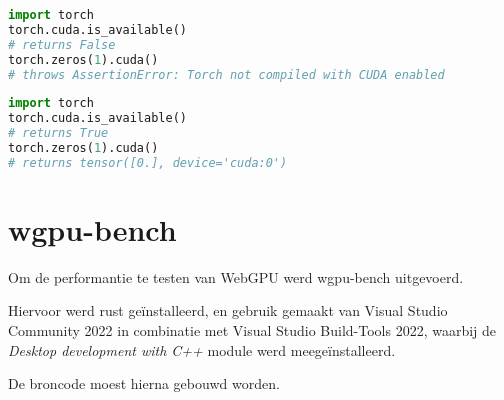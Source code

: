 \begin{lstlisting}[language=python]
import torch
torch.cuda.is_available()
# returns False
torch.zeros(1).cuda()
# throws AssertionError: Torch not compiled with CUDA enabled
\end{lstlisting}


\begin{lstlisting}[language=python]
import torch
torch.cuda.is_available()
# returns True
torch.zeros(1).cuda()
# returns tensor([0.], device='cuda:0')
\end{lstlisting}







\break{}

\section{wgpu-bench}

Om de performantie te testen van WebGPU werd wgpu-bench uitgevoerd.

Hiervoor werd rust geïnstalleerd, en gebruik gemaakt van Visual Studio Community 2022 in combinatie met Visual Studio Build-Tools 2022, waarbij de \textit{Desktop development with C++} module werd meegeïnstalleerd.

De broncode moest hierna gebouwd worden.


\break{}
